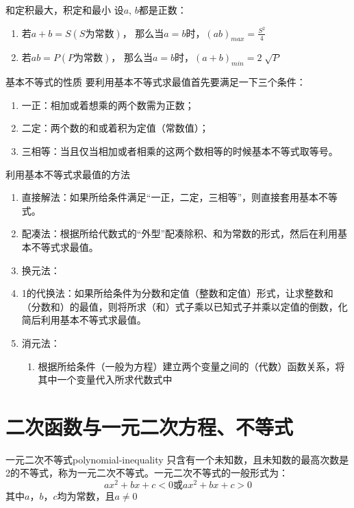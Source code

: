 \begin{theorem}{和定积最大，积定和最小}
设$a$, $b$都是正数：
\begin{enumerate}
\item 若$a+b=S (S\mbox{为常数})$， 那么当$a=b$时，$\displaystyle (ab)_{max}=\frac{S^2}{4}$
\item 若$ab=P (P\mbox{为常数})$， 那么当$a=b$时，$\displaystyle (a+b)_{min}=2\sqrt[]{P}$
\end{enumerate}
\end{theorem}


\begin{note}{基本不等式的性质}
要利用基本不等式求最值首先要满足一下三个条件：
\begin{enumerate}
\item 一正：相加或着想乘的两个数需为正数；
\item 二定：两个数的和或着积为定值（常数值）；
\item 三相等：当且仅当相加或者相乘的这两个数相等的时候基本不等式取等号。
\end{enumerate}
\end{note}

\vspace{3mm}
\begin{note}{利用基本不等式求最值的方法}
\begin{enumerate}
\item 直接解法：如果所给条件满足“一正，二定，三相等”，则直接套用基本不等式。
\item 配凑法：根据所给代数式的“外型”配凑除积、和为常数的形式，然后在利用基本不等式求最值。
\item 换元法：
\item 1的代换法：如果所给条件为分数和定值（整数和定值）形式，让求整数和（分数和）的最值，则将所求（和）式子乘以已知式子并乘以定值的倒数，化简后利用基本不等式求最值。
\item 消元法：
\begin{enumerate}
\item 根据所给条件（一般为方程）建立两个变量之间的（代数）函数关系，将其中一个变量代入所求代数式中
\end{enumerate}
\end{enumerate}
\end{note}


\section{二次函数与一元二次方程、不等式}

\begin{definition}{一元二次不等式}{polynomial-inequality}
只含有一个未知数，且未知数的最高次数是2的不等式，称为\textcolor{third}{一元二次不等式}。一元二次不等式的一般形式为：
\begin{equation}
ax^2+bx+c<0 \mbox{或} ax^2+bx+c>0
\end{equation}
其中$a$，$b$，$c$均为常数，且$a \neq 0$
\end{definition}


